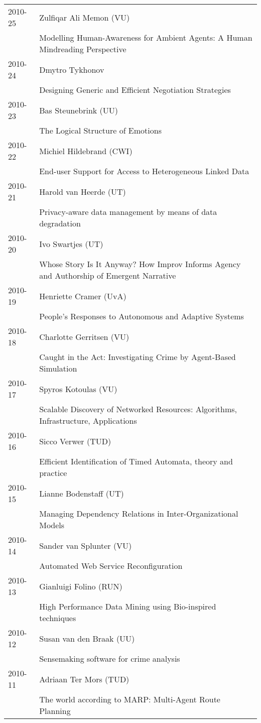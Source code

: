 \begin{longtable}{p{1.25cm}p{10.75cm}}
2010-25 & Zulfiqar Ali Memon (VU) \\& Modelling Human-Awareness for Ambient Agents: A Human Mindreading Perspective \\
2010-24 & Dmytro Tykhonov  \\& Designing Generic and Efficient Negotiation Strategies \\
2010-23 & Bas Steunebrink (UU) \\& The Logical Structure of Emotions \\
2010-22 & Michiel Hildebrand (CWI) \\& End-user Support for Access to Heterogeneous Linked Data \\
2010-21 & Harold van Heerde (UT) \\& Privacy-aware data management by means of data degradation \\
2010-20 & Ivo Swartjes (UT) \\& Whose Story Is It Anyway? How Improv Informs Agency and Authorship of Emergent Narrative \\
2010-19 & Henriette Cramer (UvA) \\& People's Responses to Autonomous and Adaptive Systems \\
2010-18 & Charlotte Gerritsen (VU) \\& Caught in the Act: Investigating Crime by Agent-Based Simulation \\
2010-17 & Spyros Kotoulas (VU) \\& Scalable Discovery of Networked Resources: Algorithms, Infrastructure, Applications \\
2010-16 & Sicco Verwer (TUD)	 \\& Efficient Identification of Timed Automata, theory and practice \\
2010-15 & Lianne Bodenstaff (UT) \\& Managing Dependency Relations in Inter-Organizational Models \\
2010-14 & Sander van Splunter (VU) \\& Automated Web Service Reconfiguration \\
2010-13 & Gianluigi Folino (RUN) \\& High Performance Data Mining using Bio-inspired techniques \\
2010-12 & Susan van den Braak (UU) \\& Sensemaking software for crime analysis \\
2010-11 & Adriaan Ter Mors (TUD) \\& The world according to MARP: Multi-Agent Route Planning \\

\end{longtable}
